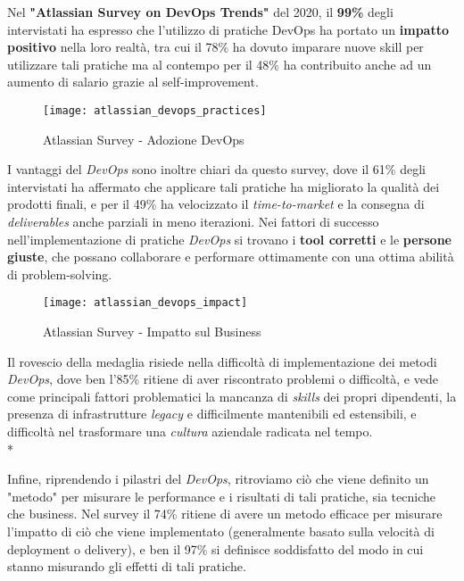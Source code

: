\documentclass[../main.tex]{subfiles}
\begin{document}
        		Nel \textbf{"Atlassian Survey on DevOps Trends"}\cite{devops_survey_2020} del 2020, il \textbf{99\%} degli intervistati ha espresso che l'utilizzo di pratiche DevOps ha portato un \textbf{impatto positivo} nella loro realtà, tra cui il 78\% ha dovuto imparare nuove skill per utilizzare tali pratiche ma al contempo per il 48\% ha contribuito anche ad un aumento di salario grazie al self-improvement.
        	
        		\begin{figure}[H]
        			\centering
        			\texttt{[image: atlassian\_devops\_practices]}
        			\caption{Atlassian Survey - Adozione DevOps}
        			\label{fig:atlassian_devops_practices}
        		\end{figure}
        
        		I vantaggi del \emph{DevOps} sono inoltre chiari da questo survey, dove il 61\% degli intervistati ha affermato che applicare tali pratiche ha migliorato la qualità dei prodotti finali, e per il 49\% ha velocizzato il \emph{time-to-market} e la consegna di \emph{deliverables} anche parziali in meno iterazioni. Nei fattori di successo nell'implementazione di pratiche \emph{DevOps} si trovano i \textbf{tool corretti} e le \textbf{persone giuste}, che possano collaborare e performare ottimamente con una ottima abilità di problem-solving.
        		
        		\begin{figure}[H]
        			\centering
        			\texttt{[image: atlassian\_devops\_impact]}
        			\caption{Atlassian Survey - Impatto sul Business}
        			\label{fig:atlassian_devops_impact}
        		\end{figure}
        		
        		Il rovescio della medaglia risiede nella difficoltà di implementazione dei metodi \emph{DevOps}, dove ben l'85\% ritiene di aver riscontrato problemi o difficoltà, e vede come principali fattori problematici la mancanza di \emph{skills} dei propri dipendenti, la presenza di infrastrutture \emph{legacy} e difficilmente mantenibili ed estensibili, e difficoltà nel trasformare una \emph{cultura} aziendale radicata nel tempo.\\*
        		
        		Infine, riprendendo i pilastri del \emph{DevOps}, ritroviamo ciò che viene definito un "metodo" per misurare le performance e i risultati di tali pratiche, sia tecniche che business. Nel survey il 74\% ritiene di avere un metodo efficace per misurare l'impatto di ciò che viene implementato (generalmente basato sulla velocità di deployment o delivery), e ben il 97\% si definisce soddisfatto del modo in cui stanno misurando gli effetti di tali pratiche.
        	
\end{document}
